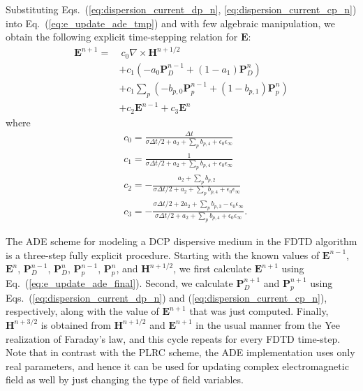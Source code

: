 Substituting Eqs.~(\ref{eq:dispersion_current_dp_n}, \ref{eq:dispersion_current_cp_n}) into Eq.~(\ref{eq:e_update_ade_tmp}) and with few algebraic manipulation, we obtain the following explicit time-stepping relation for $\mathbf{E}$:
\begin{equation}
\begin{split}
\mathbf{E}^{n+1} = & ~ c_0 \nabla \times \mathbf{H}^{n+1/2}\\
& + c_1 \left( - a_0 \mathbf{P}_D^{n-1} + (1 - a_1) \mathbf{P}_D^n \right)\\
& + c_1 \sum_p \left( - b_{p,0} \mathbf{P}_p^{n-1} + (1 - b_{p,1}) \mathbf{P}_p^n \right)\\
& + c_2 \mathbf{E}^{n-1} + c_3 \mathbf{E}^n
\end{split}
\label{eq:e_update_ade_final}
\end{equation}
where
\begin{equation}
\begin{split}
&c_0 = \frac{\Delta t}{\sigma \Delta t / 2 + a_2 + \sum_p b_{p,4} + \epsilon_0 \epsilon_\infty}\\
&c_1 = \frac{1}{\sigma \Delta t / 2 + a_2 + \sum_p b_{p,4} + \epsilon_0 \epsilon_\infty}\\
&c_2 = - \frac{a_2 + \sum_p b_{p,2}}{\sigma \Delta t / 2 + a_2 + \sum_p b_{p,4} + \epsilon_0 \epsilon_\infty}\\
&c_3 = - \frac{\sigma \Delta t / 2 + 2 a_2 + \sum_p b_{p,3} - \epsilon_0 \epsilon_\infty}{\sigma \Delta t / 2 + a_2 + \sum_p b_{p,4} + \epsilon_0 \epsilon_\infty}.
\end{split}
\end{equation}

The ADE scheme for modeling a DCP dispersive medium in the FDTD algorithm is a three-step fully explicit procedure. Starting with the known values of $\mathbf{E}^{n-1}$, $\mathbf{E}^n$, $\mathbf{P}_D^{n-1}$, $\mathbf{P}_D^n$, $\mathbf{P}_p^{n-1}$, $\mathbf{P}_p^n$, and $\mathbf{H}^{n+1/2}$, we first calculate $\mathbf{E}^{n+1}$ using Eq.~(\ref{eq:e_update_ade_final}). Second, we calculate $\mathbf{P}_D^{n+1}$ and $\mathbf{P}_p^{n+1}$ using Eqs.~(\ref{eq:dispersion_current_dp_n}) and (\ref{eq:dispersion_current_cp_n}), respectively, along with the value of $\mathbf{E}^{n+1}$ that was just computed. Finally, $\mathbf{H}^{n+3/2}$ is obtained from $\mathbf{H}^{n+1/2}$ and $\mathbf{E}^{n+1}$ in the usual manner from the Yee realization of Faraday's law, and this cycle repeats for every FDTD time-step. Note that in contrast with the PLRC scheme, the ADE implementation uses only real parameters, and hence it can be used for updating complex electromagnetic field as well by just changing the type of field variables.


